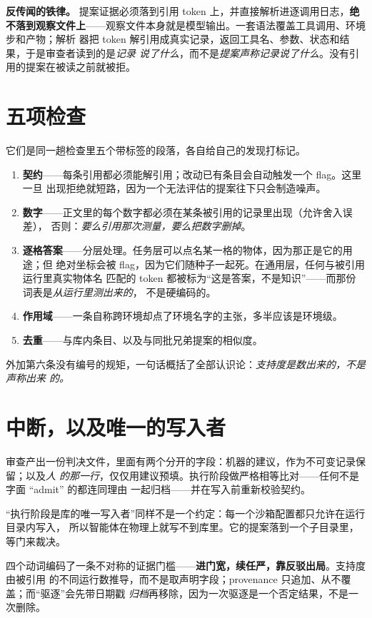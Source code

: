 \documentclass[11pt,a4paper,UTF8,fontset=macnew]{ctexrep}
\newcommand{\keyrule}[1]{\textbf{\textcolor{acc}{#1}}}
\begin{document}
\keyrule{反传闻的铁律。} 提案证据必须落到引用 token 上，并直接解析进逐调用日志，\textbf{绝
不落到观察文件上}——观察文件本身就是模型输出。一套语法覆盖工具调用、环境步和产物；解析
器把 token 解引用成真实记录，返回工具名、参数、状态和结果，于是审查者读到的是\emph{记录
说了什么}，而不是\emph{提案声称记录说了什么}。没有引用的提案在被读之前就被拒。

\section{五项检查}

它们是同一趟检查里五个带标签的段落，各自给自己的发现打标记。

\begin{enumerate}
\item \textbf{契约}——每条引用都必须能解引用；改动已有条目会自动触发一个 flag。这里一旦
      出现拒绝就短路，因为一个无法评估的提案往下只会制造噪声。
\item \textbf{数字}——正文里的每个数字都必须在某条被引用的记录里出现（允许舍入误差），
      否则：\emph{要么引用那次测量，要么把数字删掉}。
\item \textbf{逐格答案}——分层处理。任务层可以点名某一格的物体，因为那正是它的用途；但
      绝对坐标会被 flag，因为它们随种子一起死。在通用层，任何与被引用运行里真实物体名
      匹配的 token 都被标为“这是答案，不是知识”——而那份词表是\emph{从运行里测出来的}，
      不是硬编码的。
\item \textbf{作用域}——一条自称跨环境却点了环境名字的主张，多半应该是环境级。
\item \textbf{去重}——与库内条目、以及与同批兄弟提案的相似度。
\end{enumerate}

\noindent
外加第六条没有编号的规矩，一句话概括了全部认识论：\emph{支持度是数出来的，不是声称出来
的。}

\section{中断，以及唯一的写入者}

审查产出一份判决文件，里面有两个分开的字段：机器的建议，作为不可变记录保留；以及\emph{人
的那一行}，仅仅用建议预填。执行阶段做严格相等比对——任何不是字面 “admit” 的都连同理由
一起归档——并在写入前重新校验契约。

“执行阶段是库的唯一写入者”同样不是一个约定：每一个沙箱配置都只允许在运行目录内写入，
所以智能体在物理上就写不到库里。它的提案落到一个子目录里，等门来裁决。

四个动词编码了一条不对称的证据门槛——\textbf{进门宽，续任严，靠反驳出局}。支持度由被引用
的不同运行数推导，而不是取声明字段；provenance 只追加、从不覆盖；而“驱逐”会先带日期戳
\emph{归档}再移除，因为一次驱逐是一个否定结果，不是一次删除。
\end{document}
